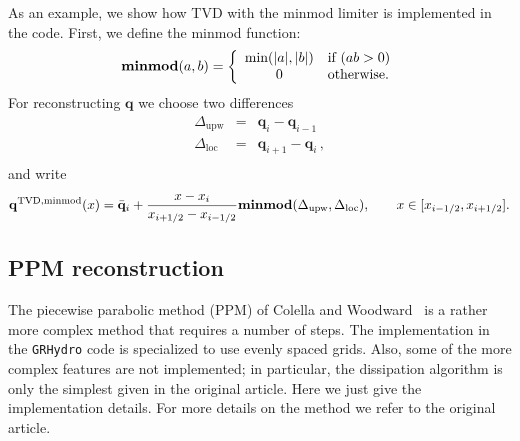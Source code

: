 \documentclass{article}
\begin{document}
As an example, we show how TVD with the minmod limiter is implemented
in the code. First, we define the minmod function:
\begin{equation}
  \label{eq:tvdminmod}
  \mathrm{\mathbf{minmod}}(a,b) = \left\{ \begin{array}{c l} 
      \textrm{min}(|a|,|b|) & \textrm{if } (a b > 0)\\
      0 & \textrm{otherwise}. \end{array}\right.
\end{equation}
For reconstructing $\mathbf{q}$ %
we choose two differences
\begin{equation}
  \begin{array}{lcl}
    \Delta_{\mathrm{upw}} & = & \mathbf{q}_i - \mathbf{q}_{i-1}\\
    \Delta_{\mathrm{loc}} & = & \mathbf{q}_{i+1} - \mathbf{q}_{i}\,,\\
  \end{array}
\end{equation}
and write
\begin{equation}
  {\bf q}^{{\rm TVD,minmod}}(x) = \bar{{\bf q}}_i + \frac{x -
  x_i}{x_{i+1/2} - x_{i-1/2}} \mathbf{minmod}(\Delta_{\mathrm{upw}},\Delta_{\mathrm{loc}}), 
    \qquad x \in [
  x_{i-1/2}, x_{i+1/2} ]. 
\end{equation}
\subsection{PPM reconstruction}
\label{sec:ppm}

The piecewise parabolic method (PPM) of Colella and
Woodward~\cite{ppm} is a rather more complex method that requires a
number of steps. The implementation in the {\tt GRHydro} code is specialized
to use evenly spaced grids. Also, some of the more complex features are not
implemented; in particular, the dissipation algorithm is only the
simplest given in the original article. Here we just give the implementation
details. For more details on the method we refer to the original
article.
\end{document}
